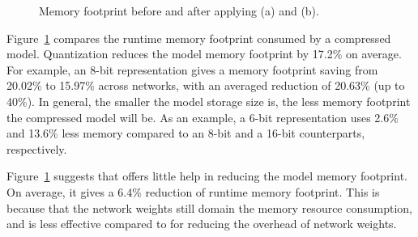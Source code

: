 \begin{figure}[!t]
\centering
{}
\hfill
{}
\hfill

\caption{Memory footprint before and after applying \quantization(a) and \pruning (b).} \label{fig:footprint}
\end{figure}

Figure~\ref{fig:footprint} compares the runtime memory footprint consumed by a compressed model. Quantization reduces the model memory
footprint by 17.2\% on average. For example, an 8-bit representation gives a memory footprint saving from 20.02\% to 15.97\% across
networks, with an averaged reduction of 20.63\% (up to 40\%). In general, the smaller the model storage size is, the less memory footprint
the compressed model will be. As an example, a 6-bit representation uses 2.6\% and 13.6\% less memory compared to an 8-bit and a 16-bit
counterparts, respectively.

Figure~\ref{fig:footprint} suggests that  \pruning offers little help in reducing the model memory footprint. On average, it gives a 6.4\%
reduction of runtime memory footprint. This is because that the network weights still domain the memory resource consumption, and \pruning
is less effective compared to \dquantization for reducing the overhead of network weights.



